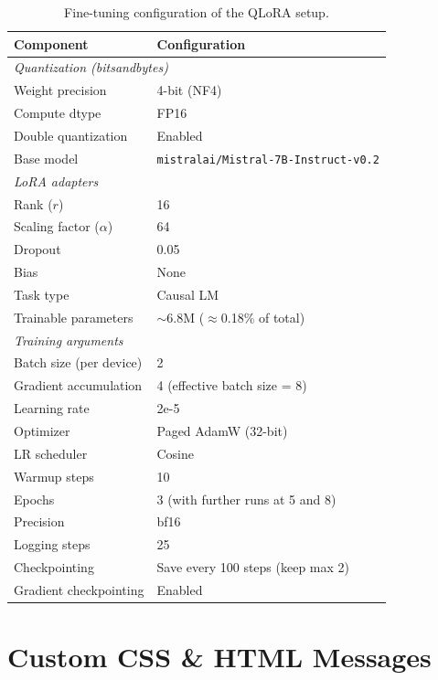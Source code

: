 \begin{table}[htbp]
    \centering
    \caption{Fine-tuning configuration of the QLoRA setup.}
    \label{tab:finetune_config}
    \begin{tabular}{ll}
    \hline
    \textbf{Component} & \textbf{Configuration} \\
    \hline
    \multicolumn{2}{l}{\textit{Quantization (bitsandbytes)}} \\
    Weight precision & 4-bit (NF4) \\
    Compute dtype & FP16 \\
    Double quantization & Enabled \\
    Base model & \texttt{mistralai/Mistral-7B-Instruct-v0.2} \\
    \hline
    \multicolumn{2}{l}{\textit{LoRA adapters}} \\
    Rank ($r$) & 16 \\
    Scaling factor ($\alpha$) & 64 \\
    Dropout & 0.05 \\
    Bias & None \\
    Task type & Causal LM \\
    Trainable parameters & $\sim$6.8M ($\approx$0.18\% of total) \\
    \hline
    \multicolumn{2}{l}{\textit{Training arguments}} \\
    Batch size (per device) & 2 \\
    Gradient accumulation & 4 (effective batch size = 8) \\
    Learning rate & 2e-5 \\
    Optimizer & Paged AdamW (32-bit) \\
    LR scheduler & Cosine \\
    Warmup steps & 10 \\
    Epochs & 3 (with further runs at 5 and 8) \\
    Precision & bf16 \\
    Logging steps & 25 \\
    Checkpointing & Save every 100 steps (keep max 2) \\
    Gradient checkpointing & Enabled \\
    \hline
    \end{tabular}
\end{table}



\section{Custom CSS \& HTML Messages}

